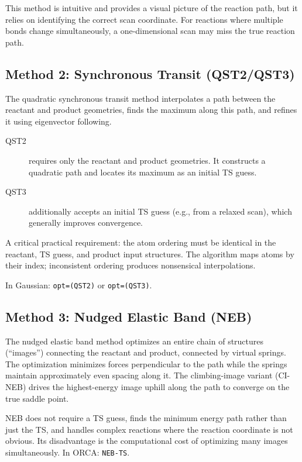 \documentclass[11pt]{article}
\numberwithin{equation}{section}
\begin{document}
This method is intuitive and provides a visual picture of the reaction path, but it relies on identifying the correct scan coordinate. For reactions where multiple bonds change simultaneously, a one-dimensional scan may miss the true reaction path.

\subsection{Method 2: Synchronous Transit (QST2/QST3)}

The quadratic synchronous transit method interpolates a path between the reactant and product geometries, finds the maximum along this path, and refines it using eigenvector following.

\begin{description}
\item[QST2] requires only the reactant and product geometries. It constructs a quadratic path and locates its maximum as an initial TS guess.
\item[QST3] additionally accepts an initial TS guess (e.g., from a relaxed scan), which generally improves convergence.
\end{description}

A critical practical requirement: the atom ordering must be identical in the reactant, TS guess, and product input structures. The algorithm maps atoms by their index; inconsistent ordering produces nonsensical interpolations.

In Gaussian: \texttt{opt=(QST2)} or \texttt{opt=(QST3)}.

\subsection{Method 3: Nudged Elastic Band (NEB)}

The nudged elastic band method optimizes an entire chain of structures (``images'') connecting the reactant and product, connected by virtual springs. The optimization minimizes forces perpendicular to the path while the springs maintain approximately even spacing along it. The climbing-image variant (CI-NEB) drives the highest-energy image uphill along the path to converge on the true saddle point.

NEB does not require a TS guess, finds the minimum energy path rather than just the TS, and handles complex reactions where the reaction coordinate is not obvious. Its disadvantage is the computational cost of optimizing many images simultaneously. In ORCA: \texttt{NEB-TS}.
\end{document}
